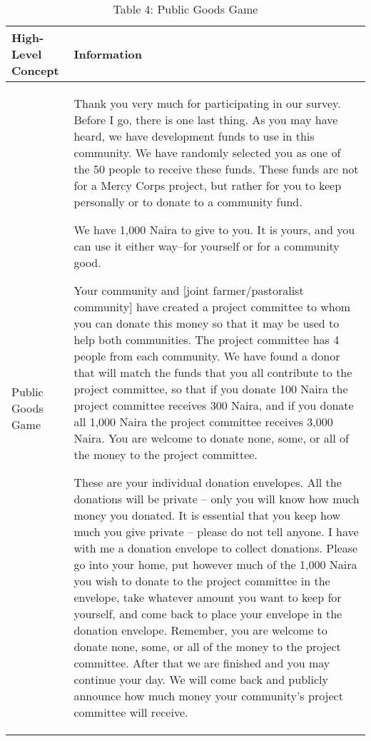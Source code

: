 \documentclass{article}
\begin{document}
	
	\begin{table}[ht]
		\centering
		\begin{tabular}{|p{}|p{}|}
			\hline
			\textbf{High-Level Concept} & \textbf{Information} \\
			\hline
			Public Goods Game &
			Thank you very much for participating in our survey. Before I go, there is one last thing. As you may have heard, we have development funds to use in this community. We have randomly selected you as one of the 50 people to receive these funds. These funds are not for a Mercy Corps project, but rather for you to keep personally or to donate to a community fund.
			
			\vspace{8pt}
			We have 1,000 Naira to give to you. It is yours, and you can use it either way--for yourself or for a community good.
			
			Your community and [joint farmer/pastoralist community] have created a project committee to whom you can donate this money so that it may be used to help both communities. The project committee has 4 people from each community. We have found a donor that will match the funds that you all contribute to the project committee, so that if you donate 100 Naira the project committee receives 300 Naira, and if you donate all 1,000 Naira the project committee receives 3,000 Naira. You are welcome to donate none, some, or all of the money to the project committee.
			
			These are your individual donation envelopes. All the donations will be private -- only you will know how much money you donated. It is essential that you keep how much you give private -- please do not tell anyone. I have with me a donation envelope to collect donations. Please go into your home, put however much of the 1,000 Naira you wish to donate to the project committee in the envelope, take whatever amount you want to keep for yourself, and come back to place your envelope in the donation envelope. Remember, you are welcome to donate none, some, or all of the money to the project committee. After that we are finished and you may continue your day. We will come back and publicly announce how much money your community's project committee will receive.
			\\
			\hline
		\end{tabular}
		\caption{Table 4: Public Goods Game}
	\end{table}
	
\end{document}
